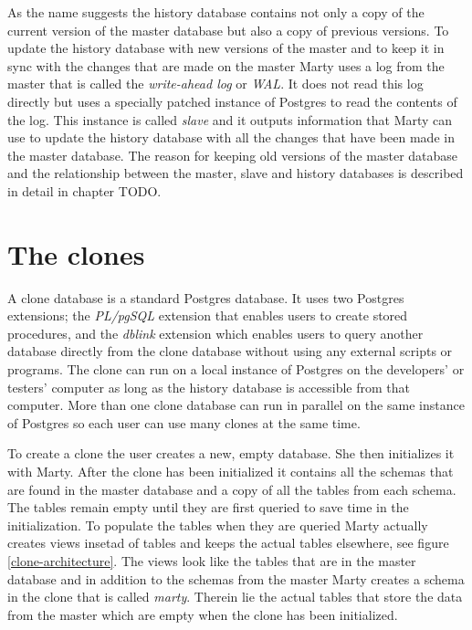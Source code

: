 \documentclass[a4paper,12pt,twoside,BCOR=10mm]{scrbook}
\begin{document}
As the name suggests the history database contains not only a copy of the current version of the master database but also a copy of previous versions. To update the history database with new versions of the master and to keep it in sync with the changes that are made on the master Marty uses a log from the master that is called the \textit{write-ahead log} or \textit{WAL}. It does not read this log directly but uses a specially patched instance of Postgres to read the contents of the log. This instance is called \textit{slave} and it outputs information that Marty can use to update the history database with all the changes that have been made in the master database. The reason for keeping old versions of the master database and the relationship between the master, slave and history databases is described in detail in chapter TODO.

\section{The clones}
\label{sec:clones}
A clone database is a standard Postgres database. It uses two Postgres extensions; the \textit{PL/pgSQL} extension that enables users to create stored procedures, and the \textit{dblink} extension which enables users to query another database directly from the clone database without using any external scripts or programs. The clone can run on a local instance of Postgres on the developers' or testers' computer as long as the history database is accessible from that computer. More than one clone database can run in parallel on the same instance of Postgres so each user can use many clones at the same time.

To create a clone the user creates a new, empty database. She then initializes it with Marty. After the clone has been initialized it contains all the schemas that are found in the master database and a copy of all the tables from each schema. The tables remain empty until they are first queried to save time in the initialization. To populate the tables when they are queried Marty actually creates views insetad of tables and keeps the actual tables elsewhere, see figure \ref{clone-architecture}. The views look like the tables that are in the master database and in addition to the schemas from the master Marty creates a schema in the clone that is called \textit{marty}. Therein lie the actual tables that store the data from the master which are empty when the clone has been initialized.
\end{document}
